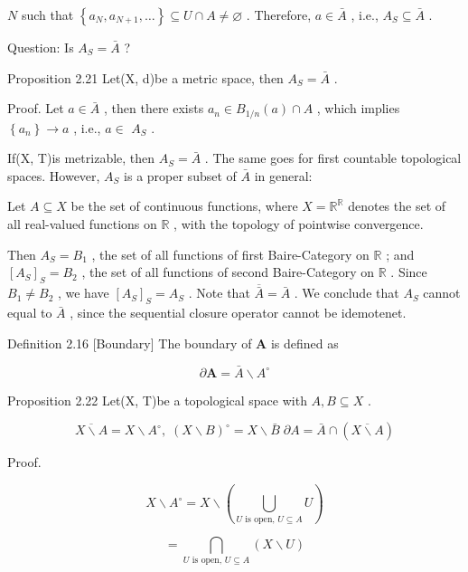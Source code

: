 \(N\) such that \(\left\{  {{a}_{N},{a}_{N + 1},\ldots }\right\}   \subseteq  U \cap  A \neq  \varnothing\) . Therefore, \(a \in  \bar{A}\) , i.e., \({A}_{S} \subseteq  \bar{A}\) .

Question: Is \({A}_{S} = \bar{A}\) ?

Proposition 2.21 Let(X, d)be a metric space, then \({A}_{S} = \bar{A}\) .

Proof. Let \(a \in  \bar{A}\) , then there exists \({a}_{n} \in  {B}_{1/n}\left( a\right)  \cap  A\) , which implies \(\left\{  {a}_{n}\right\}   \rightarrow  a\) , i.e., \(a \in\)  \({A}_{S}\) .

If(X, T)is metrizable, then \({A}_{S} = \bar{A}\) . The same goes for first countable topological spaces. However, \({A}_{S}\) is a proper subset of \(\bar{A}\) in general:

Let \(A \subseteq  X\) be the set of continuous functions, where \(X = {\mathbb{R}}^{\mathbb{R}}\) denotes the set of all real-valued functions on \(\mathbb{R}\) , with the topology of pointwise convergence.

Then \({A}_{S} = {B}_{1}\) , the set of all functions of first Baire-Category on \(\mathbb{R}\) ; and \({\left\lbrack  {A}_{S}\right\rbrack  }_{S} = {B}_{2}\) , the set of all functions of second Baire-Category on \(\mathbb{R}\) . Since \({B}_{1} \neq  {B}_{2}\) , we have \({\left\lbrack  {A}_{S}\right\rbrack  }_{S} = {A}_{S}\) . Note that \(\overline{\bar{A}} = \bar{A}\) . We conclude that \({A}_{S}\) cannot equal to \(\bar{A}\) , since the sequential closure operator cannot be idemotenet.

Definition 2.16 [Boundary] The boundary of \(\mathbf{A}\) is defined as

\[
\partial \mathbf{A} = \bar{A} \smallsetminus  {A}^{ \circ  }
\]

Proposition 2.22 Let(X, T)be a topological space with \(A,B \subseteq  X\) .

\[
\overline{X \smallsetminus  A} = X \smallsetminus  {A}^{ \circ  },\;{\left( X \smallsetminus  B\right) }^{ \circ  } = X \smallsetminus  \bar{B}\;\partial A = \bar{A} \cap  \left( \overline{X \smallsetminus  A}\right)
\]

Proof.

\[
X \smallsetminus  {A}^{ \circ  } = X \smallsetminus  \left( {\mathop{\bigcup }\limits_{{U\text{ is open, }U \subseteq  A}}U}\right)  \tag{2.2a}
\]

\[
= \mathop{\bigcap }\limits_{{U\text{ is open, }U \subseteq  A}}\left( {X \smallsetminus  U}\right)  \tag{2.2b}
\]

